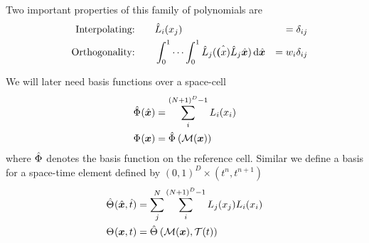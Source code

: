 Two important properties of this family of polynomials are
  \begin{alignat}{10}
    \label{eq:basis-interpolating}
&& \text{Interpolating:} \qquad & \lagrangeRef[i] (x_j) &= \delta_{ij}\\
\label{eq:basis-orthogonality}
&& \text{Orthogonality:} \qquad &
\int_0^1 \cdots \int_0^1 \lagrangeRef[j](\hat{\bm(x)} \lagrangeRef[j]{\hat{\bm{x}}}) \dd{\hat{\bm{x}}}  &= \quadWeight[i] \delta_{ij}
    \end{alignat}

We will later need basis functions over a space-cell 
\begin{align}\label{eq:space-basis}
  \begin{split}
  \sbasisRef(\hat{\bm{x}}) &= \sum_i^{(N+1)^D - 1} \lagrange[i] (x_i)\\
  \sbasis(\bm{x}) &= \sbasisRef \left( \mapping(\bm{x}) \right)
  \end{split}
\end{align}
where $\sbasisRef$ denotes the basis function on the reference cell.
Similar we define a basis for a space-time element defined by $(0, 1)^D \times (t^n, t^{n+1})$
\begin{align}\label{eq:space-time-basis}
  \begin{split}
  \stbasisRef(\hat{\bm{x}}, \hat{t}) &= \sum_j^{N} \sum_i^{(N+1)^D - 1} \lagrange[j](x_j) \lagrange[i] (x_i)\\
  \stbasis (\bm{x}, t) &= \stbasisRef \left( \mapping(\bm{x}), \timeMapping(t) \right)
  \end{split}
\end{align}

